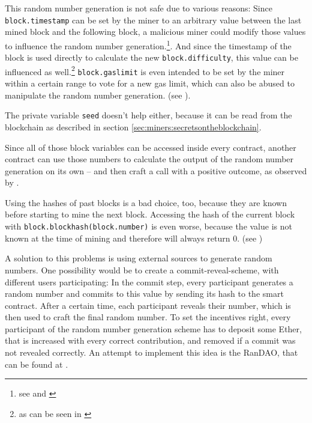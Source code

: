 This random number generation is not safe due to various reasons: Since \texttt{block.timestamp} can be set by the miner to an arbitrary value between the last mined block and the following block, a malicious miner could modify those values to influence the random number generation.\footnote{see \cite[Special variables and functions]{ethereum:solidity} and \cite[Section 4.3.4, equation 48]{ethereum:yellowpaper}}. And since the timestamp of the block is used directly to calculate the new \texttt{block.difficulty}, this value can be influenced as well.\footnote{as can be seen in  \cite[equation 41 and 44]{ethereum:yellowpaper}} \texttt{block.gaslimit} is even intended to be set by the miner within a certain range to vote for a new gas limit, which can also be abused to manipulate the random number generation. (see \cite[Section 4.3.4, equation 47]{ethereum:yellowpaper}).

The private variable \texttt{seed} doesn't help either, because it can be read from the blockchain as described in section \ref{sec:miners:secretsontheblockchain}.

Since all of those block variables can be accessed inside every contract, another contract can use those numbers to calculate the output of the random number generation on its own -- and then craft a call with a positive outcome, as observed by \cite[Contracts calling contracts]{swende:breakingthehouse}.

Using the hashes of past blocks is a bad choice, too, because they are known before starting to mine the next block. Accessing the hash of the current block with \texttt{block.blockhash(block.number)} is even worse, because the value is not known at the time of mining and therefore will always return \( 0 \). (see \cite{positive:predictingrandomnumbers})

A solution to this problems is using external sources to generate random numbers. One possibility would be to create a commit-reveal-scheme, with different users participating: In the commit step, every participant generates a random number and commits to this value by sending its hash to the smart contract. After a certain time, each participant reveals their number, which is then used to craft the final random number. To set the incentives right, every participant of the random number generation scheme has to deposit some Ether, that is increased with every correct contribution, and removed if a commit was not revealed correctly. An attempt to implement this idea is the RanDAO, that can be found at \cite{github:randao}.

